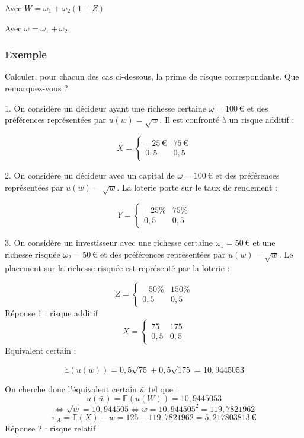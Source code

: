 \documentclass[a4paper, 12pt]{report}
\begin{document}
Avec \( W = \omega_1 + \omega_2(1 + Z) \)

Avec \( \omega = \omega_1 + \omega_2 \).

\subsubsection{Exemple}
Calculer, pour chacun des cas ci-dessous, la prime de risque correspondante. Que remarquez-vous ?

1. On considère un décideur ayant une richesse certaine \( \omega = 100 \, \text{€} \) et des préférences représentées par \( u(w) = \sqrt{w} \). Il est confronté à un risque additif : 

\[
X = \begin{cases}
-25 \, \text{€} & 	75 \, \text{€} \\
0,5  &  0,5
\end{cases}
\]

2. On considère un décideur avec un capital de \( \omega = 100 \, \text{€} \) et des préférences représentées par \( u(w) = \sqrt{w} \). La loterie porte sur le taux de rendement : 

\[
Y = \begin{cases}
	-25\% & 75\%\\
	0,5 & 0,5
\end{cases}
\]

3. On considère un investisseur avec une richesse certaine \( \omega_1 = 50 \, € \) et une richesse risquée \( \omega_2 = 50 \, € \) et des préférences représentées par \( u(w) = \sqrt{w}\). Le placement sur la richesse risquée est représenté par la loterie : 

\[
Z = \begin{cases}
	-50\% & 150\%  \\
	0,5 &  0,5
\end{cases}
\]
Réponse 1 : risque additif 
\[
X = \begin{cases}
	75  & 175\\
	0,5  &  0,5
\end{cases}
\]
Equivalent certain : 

\[ 
\mathbb{E}\left( u(w)\right) =0,5\sqrt{75}+0,5\sqrt{175}=10,9445053
\]

On cherche donc l'équivalent certain $\bar{w}$ tel que :
\[ u(\bar{w})= \mathbb{E}\left( u(W) \right)=10,9445053 \]
\[ \Leftrightarrow \sqrt{\bar{w}}=10,944505 \Leftrightarrow \bar{w} =10,944505^2 =119,7821962
\]
\[
\pi_A = \mathbb{E}(X) - \bar{w} = 125-119,7821962=5,217803813
\, \text{€}
\]
Réponse 2 : risque relatif 
\end{document}
